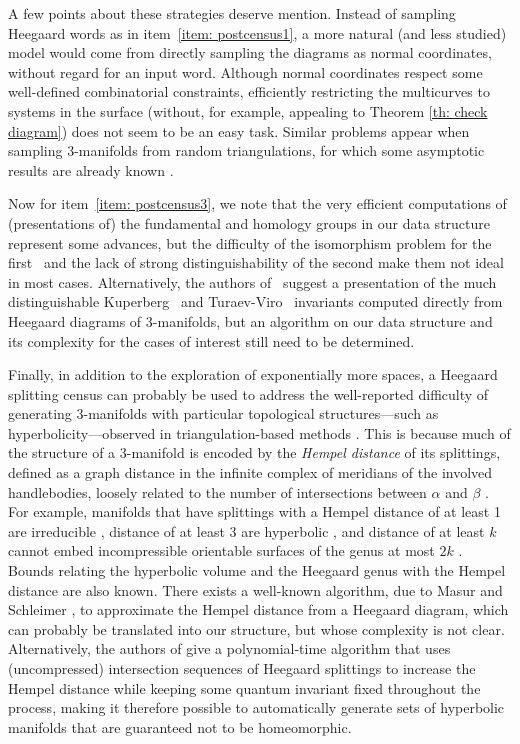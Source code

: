 \documentclass[11pt]{amsart}
\numberwithin{equation}{section}
\theoremstyle{plain}
\theoremstyle{definition}
\begin{document}
A few points about these strategies deserve mention.
Instead of sampling Heegaard words as in item~\ref{item: postcensus1}, a more natural (and less studied) model would come from directly sampling the diagrams as normal coordinates, without regard for an input word.
Although normal coordinates respect some well-defined combinatorial constraints, efficiently restricting the multicurves to systems in the surface (without, for example, appealing to Theorem \ref{th: check diagram}) does not seem to be an easy task. 
Similar problems appear when sampling 3-manifolds from random triangulations, for which some asymptotic results are already known \cite{petri2022model}.

Now for item~\ref{item: postcensus3}, we note that the very efficient computations of (presentations of) the fundamental and homology groups in our data structure represent some advances, but the difficulty of the isomorphism problem for the first~\cite{aschenbrenner20153} and the lack of strong distinguishability of the second make them not ideal in most cases. 
Alternatively, the authors of~\cite{costantino2020kuperberg} suggest a presentation of the much distinguishable Kuperberg~\cite{kuperberg1991involutory} and Turaev-Viro~\cite{turaev2010quantum} invariants computed directly from Heegaard diagrams of 3-manifolds, but an algorithm on our data structure and its complexity for the cases of interest still need to be determined. 

Finally, in addition to the exploration of exponentially more spaces, a Heegaard splitting census can probably be used to address the well-reported difficulty of generating 3-manifolds with particular topological structures---such as hyperbolicity---observed in triangulation-based methods \cite{matveev2007algorithmic}.
This is because much of the structure of a 3-manifold is encoded by the \emph{Hempel distance} of its splittings, defined as a graph distance in the infinite complex of meridians of the involved handlebodies, loosely related to the number of intersections between $\alpha$ and $\beta$ \cite{hempel20013}. 
For example, manifolds that have splittings with a Hempel distance of at least 1 are irreducible \cite{kobayashi1988casson}, distance of at least 3 are hyperbolic \cite{hempel20013}, and distance of at least $k$ cannot embed incompressible orientable surfaces of the genus at most $2k$ \cite{hartshorn2002heegaard}. 
Bounds relating the hyperbolic volume \cite{hamenstadt2022stability,kobayashi2013hyperbolicvolumeheegaarddistance} and the Heegaard genus \cite{scharlemann2006alternate} with the Hempel distance are also known. 
There exists a well-known algorithm, due to Masur and Schleimer \cite{masur2013geometry}, to approximate the Hempel distance from a Heegaard diagram, which can probably be translated into our structure, but whose complexity is not clear. 
Alternatively, the authors of \cite{ennes2025hardnesscomputationquantuminvariants} give a polynomial-time algorithm that uses (uncompressed) intersection sequences of Heegaard splittings to increase the Hempel distance while keeping some quantum invariant fixed throughout the process, making it therefore possible to automatically generate sets of hyperbolic manifolds that are guaranteed not to be homeomorphic.
\end{document}
